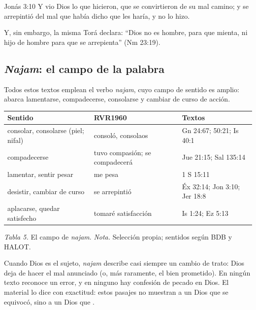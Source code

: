 \begin{verso}{Jonás 3:10}
Y vio Dios lo que hicieron, que se convirtieron de su mal camino; y se arrepintió del mal que había dicho que les haría, y no lo hizo.
\end{verso}

Y, sin embargo, la misma Torá declara: ``Dios no es hombre, para que mienta, ni hijo de hombre para que se arrepienta'' (Nm 23:19).

\subsection{\emph{Najam}: el campo de la palabra}
Todos estos textos emplean el verbo  \emph{najam}, cuyo campo de sentido es amplio: abarca lamentarse, compadecerse, consolarse y cambiar de curso de acción.

\begin{center}\small\renewcommand{\arraystretch}{1.18}
\begin{tabular}{@{}L{4.2cm}L{4.0cm}L{5.6cm}@{}}
\toprule
\textbf{Sentido} & \textbf{RVR1960} & \textbf{Textos} \\ \midrule
consolar, consolarse (piel; nifal) & consoló, consolaos & Gn 24:67; 50:21; Is 40:1 \\
compadecerse & tuvo compasión; se compadecerá & Jue 21:15; Sal 135:14 \\
lamentar, sentir pesar & me pesa & 1 S 15:11 \\
desistir, cambiar de curso & se arrepintió & Éx 32:14; Jon 3:10; Jer 18:8 \\
aplacarse, quedar satisfecho & tomaré satisfacción & Is 1:24; Ez 5:13 \\
\bottomrule
\end{tabular}\par
{\footnotesize\color{gris}\textit{Tabla 5.} El campo de \emph{najam}. \textit{Nota.} Selección propia; sentidos según BDB y HALOT.}
\end{center}

Cuando Dios es el sujeto, \emph{najam} describe casi siempre un cambio de trato: Dios deja de hacer el mal anunciado (o, más raramente, el bien prometido). En ningún texto reconoce un error, y en ninguno hay confesión de pecado en Dios. El material lo dice con exactitud: estos pasajes no muestran a un Dios que se equivocó, sino a un Dios que .

